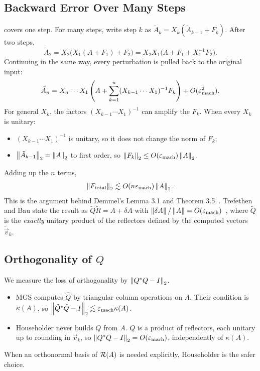 \subsection{Backward Error Over Many Steps}

 covers one step. For many steps, write step $k$ as $\tilde{A}_k = X_k(\tilde{A}_{k-1} + F_k)$. After two steps,
\begin{equation*}
  \tilde{A}_2 = X_2\big(X_1(A + F_1) + F_2\big) = X_2X_1\big(A + F_1 + X_1^{-1}F_2\big).
\end{equation*}
Continuing in the same way, every perturbation is pulled back to the original input:
\begin{equation}
  \tilde{A}_n = X_n \cdots X_1\left(A + \sum_{k=1}^{n}(X_{k-1} \cdots X_1)^{-1}F_k\right) + O(\varepsilon_{\mathrm{mach}}^2).
\end{equation}
For general $X_k$, the factors $(X_{k-1} \cdots X_1)^{-1}$ can amplify the $F_k$. When every $X_k$ is unitary:
\begin{itemize}
  \item $(X_{k-1} \cdots X_1)^{-1}$ is unitary, so it does not change the norm of $F_k$;
  \item $\left\lVert \tilde{A}_{k-1} \right\rVert_2 = \left\lVert A \right\rVert_2$ to first order, so $\left\lVert F_k \right\rVert_2 \le O(\varepsilon_{\mathrm{mach}})\left\lVert A \right\rVert_2$.
\end{itemize}
Adding up the $n$ terms,
\begin{equation}
  \left\lVert F_{\mathrm{total}} \right\rVert_2 \lesssim O(n\varepsilon_{\mathrm{mach}})\left\lVert A \right\rVert_2.
\end{equation}
This is the argument behind Demmel's Lemma 3.1 and Theorem 3.5~\cite[\S3.4.3]{Demmel}. Trefethen and Bau state the result as $\tilde{Q}\tilde{R} = A + \delta A$ with $\left\lVert \delta A \right\rVert/\left\lVert A \right\rVert = O(\varepsilon_{\mathrm{mach}})$~\cite[Theorem 16.1]{TB}, where $\tilde{Q}$ is the \emph{exactly} unitary product of the reflectors defined by the computed vectors $\tilde{\vec{v}}_k$.

\subsection{Orthogonality of $Q$}

We measure the loss of orthogonality by $\left\lVert Q^\ast Q - I \right\rVert_2$.
\begin{itemize}
  \item MGS computes $\hat{Q}$ by triangular column operations on $A$. Their condition is $\kappa(A)$, so $\left\lVert \hat{Q}^\ast\hat{Q} - I \right\rVert_2 \lesssim \varepsilon_{\mathrm{mach}}\kappa(A)$.
  \item Householder never builds $Q$ from $A$. $Q$ is a product of reflectors, each unitary up to rounding in $\vec{v}_k$, so $\left\lVert Q^\ast Q - I \right\rVert_2 = O(\varepsilon_{\mathrm{mach}})$, independently of $\kappa(A)$.
\end{itemize}
When an orthonormal basis of $\mathcal{R}(A)$ is needed explicitly, Householder is the safer choice.

